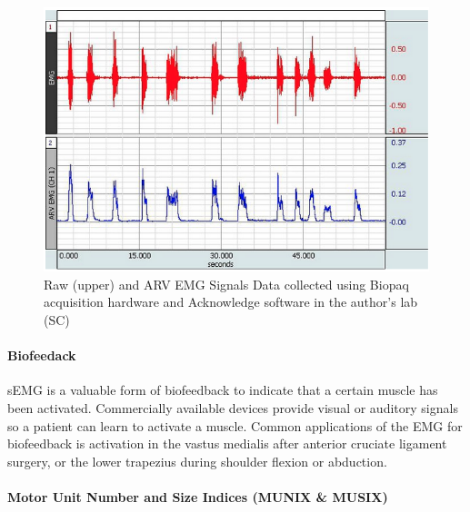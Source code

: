 \begin{figure}[!ht]
    \centering
    \includegraphics[width=1\linewidth]{./figure/EMG_ARV.png}
    \caption{Raw (upper) and ARV EMG Signals \footnotesize{Data collected using Biopaq acquisition hardware and Acknowledge software in the author's lab (SC)}}
    \label{fig:EMG_ARV}
\end{figure}

\paragraph{Biofeedack}

sEMG is a valuable form of biofeedback to indicate that a certain muscle has been activated. Commercially available devices provide visual or auditory signals so a patient can learn to activate a muscle. Common applications of the EMG for biofeedback is activation in the vastus medialis after anterior cruciate ligament surgery, or the lower trapezius during shoulder flexion or abduction.

\paragraph{Motor Unit Number and Size Indices (MUNIX \& MUSIX)}


